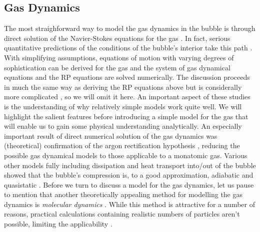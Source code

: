\documentclass[rmp,aps,nofootinbib,superscriptaddress,floatfix]{revtex4-2}
\begin{document}
\subsection{Gas Dynamics}
The most straighforward way to model the gas dynamics in the bubble is through direct solution of the Navier-Stokes equations for the gas \cite{brenner2002single}. In fact, serious quantitative predictions of the conditions of the bubble's interior take this path \cite{an2006mechanism,an2008spectral,an2009diagnosing,flannigan2005plasma,flannigan2006measurement}. With simplifying assumptions, equations of motion with varying degrees of sophistication can be derived for the gas and the system of gas dynamical equations and the RP equations are solved numerically. The discussion proceeds in much the same way as deriving the RP equations above but is considerally more complicated \cite{brenner2002single,yasui2018acoustic}, so we will omit it here. An important aspect of these studies is the understanding of why relatively simple models work quite well. We will highlight the salient features before introducing a simple model for the gas that will enable us to gain some physical understanding analytically. An especially important result of direct numerical solution of the gas dynamics was (theoretical) confirmation of the argon rectification hypothesis \cite{}, reducing the possible gas dynamical models to those applicable to a monatomic gas. Various other models fully including dissipation and heat transport into/out of the bubble showed that the bubble's compression is, to a good approximation, adiabatic and quasistatic \cite{}. Before we turn to discuss a model for the gas dynamics, let us pause to mention that another theoretically appealing method for modelling the gas dynamics is \emph{molecular dynamics} \cite{}. While this method is attractive for a number of reasons, practical calculations containing realistic numbers of particles aren't possible, limiting the applicability \cite{brenner2002single}.
\end{document}
